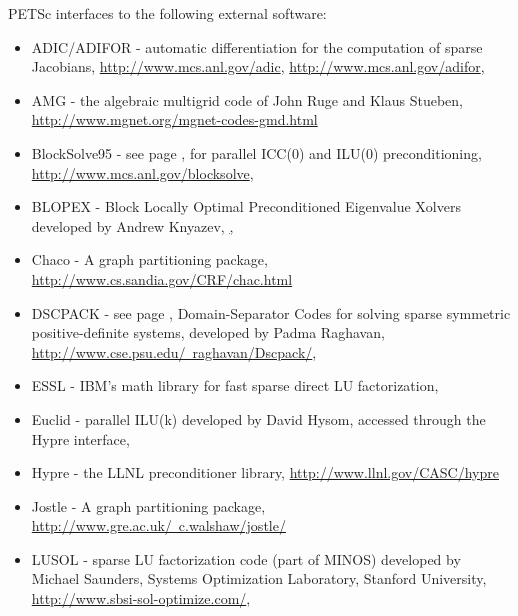 \vspace{.3in}
\noindent
PETSc interfaces to the following external software:
\begin{itemize}
  \item ADIC/ADIFOR -  automatic differentiation for the computation of sparse Jacobians, 
                     \href{http://www.mcs.anl.gov/adic}{http://www.mcs.anl.gov/adic},
                     \href{http://www.mcs.anl.gov/adifor}{http://www.mcs.anl.gov/adifor},
  \item AMG -         the algebraic multigrid code of John Ruge and Klaus Stueben,
                     \href{http://www.mgnet.org/mgnet-codes-gmd.html}{http://www.mgnet.org/mgnet-codes-gmd.html}
  \item BlockSolve95 - see page \pageref{sec_blocksolve}, for parallel ICC(0) and ILU(0) preconditioning,
                     \href{http://www.mcs.anl.gov/blocksolve}{http://www.mcs.anl.gov/blocksolve},
  \item BLOPEX - Block Locally Optimal Preconditioned Eigenvalue Xolvers developed by Andrew Knyazev,
                    \href{http://www-math.cudenver.edu/~aknyazev/software/BLOPEX/},
  \item Chaco -     A graph partitioning package, \href{ http://www.cs.sandia.gov/CRF/chac.html}{ http://www.cs.sandia.gov/CRF/chac.html}
  \item DSCPACK -    see page \pageref{sec_externalsol}, Domain-Separator Codes for solving sparse symmetric
                      positive-definite systems, 
                     developed by Padma Raghavan,   
                     \href{http://www.cse.psu.edu/~raghavan/Dscpack/}{http://www.cse.psu.edu/~raghavan/Dscpack/},
  \item ESSL -         IBM's math library for fast sparse direct LU factorization,
  \item Euclid  -   parallel ILU(k) developed by David Hysom, accessed through the Hypre interface,
  \item Hypre -    the LLNL preconditioner library, \href{http://www.llnl.gov/CASC/hypre}{http://www.llnl.gov/CASC/hypre}
  \item Jostle -     A graph partitioning package, \href{http://www.gre.ac.uk/~c.walshaw/jostle/}{http://www.gre.ac.uk/~c.walshaw/jostle/}
  \item LUSOL -       sparse LU factorization code (part of MINOS) developed by Michael Saunders,
                      Systems Optimization Laboratory, Stanford University,
                     \href{http://www.sbsi-sol-optimize.com/}{http://www.sbsi-sol-optimize.com/},

\end{itemize}
